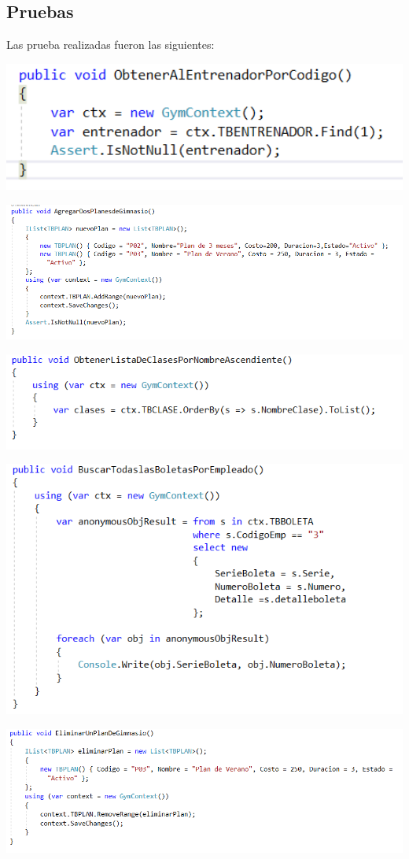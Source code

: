 \subsection{Pruebas}
Las prueba realizadas fueron las siguientes:
\begin{center}
\includegraphics[width=15cm]{./Imagenes/prueba1.png}
\end{center}
\begin{center}
\includegraphics[width=15cm]{./Imagenes/prueba2.png}
\end{center}
\begin{center}
\includegraphics[width=15cm]{./Imagenes/prueba3.png}
\end{center}
\begin{center}
\includegraphics[width=15cm]{./Imagenes/prueba4.png}
\end{center}
\begin{center}
\includegraphics[width=15cm]{./Imagenes/prueba5.png}
\end{center}








